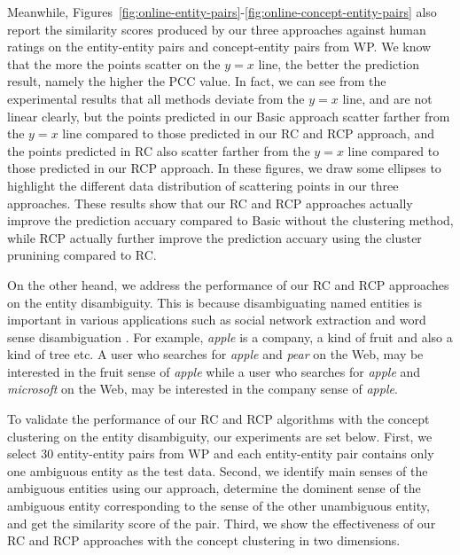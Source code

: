 Meanwhile, Figures~\ref{fig:online-entity-pairs}-\ref{fig:online-concept-entity-pairs} also report the similarity scores produced by
our three approaches against human ratings on the entity-entity pairs and concept-entity pairs from WP. We know that the more the points scatter on the $y = x$ line, the better the prediction result, namely the higher the PCC value. In fact, we can see from the experimental results that all methods deviate from the $y = x$ line,
and are not linear clearly, but the points predicted in our Basic approach scatter farther from the $y = x$ line compared to those predicted in our RC and RCP approach, and the points predicted in RC also scatter farther from the $y = x$ line compared to those predicted in our RCP approach. In these figures, we draw some ellipses to highlight the different data distribution of scattering points in our three approaches. These results show that our RC and RCP approaches actually improve the prediction accuary compared to Basic without the clustering method, while RCP actually further improve the prediction accuary using the cluster prunining compared to RC.

On the other heand, we address the performance of our RC and RCP approaches on the entity disambiguity. This is because disambiguating named entities is important in various applications such as social network extraction \cite{Theodosis:Automatic} and word sense disambiguation \cite{WSD:Resnik}\cite{WSD:Roberto}\cite{Yoshida:Person}. For example, \emph{apple} is a company, a kind of fruit and also a kind of tree etc. A user who searches for
\emph{apple} and \emph{pear} on the Web, may be interested in the fruit sense of \emph{apple} while a user who searches for
\emph{apple} and \emph{microsoft} on the Web, may be interested in the company sense of \emph{apple}.

To validate the performance of our RC and RCP algorithms with the concept clustering on the entity disambiguity, our experiments are set below. First, we select 30 entity-entity pairs from WP and each entity-entity pair contains only one ambiguous entity as the test data. Second, we identify main senses of the ambiguous entities using our approach, determine the dominent sense of the ambiguous entity corresponding to the sense of the other unambiguous entity, and get the similarity score of the pair. Third, we show the effectiveness of our RC and RCP approaches with the concept clustering in two dimensions.

